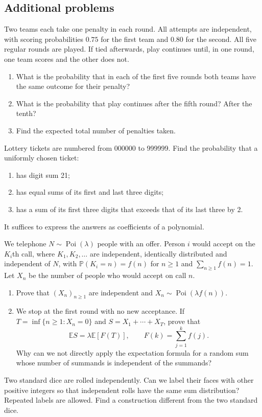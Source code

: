 \documentclass[11pt,a4paper]{article}
\newenvironment{enumeratea}{\begin{enumerate}[label=(\alph*),itemsep=0.28em,topsep=0.25em]}{\end{enumerate}}
\newcommand{\Pbb}{\mathbb P}
\newcommand{\Ebb}{\mathbb E}
\newcommand{\Poi}{\operatorname{Poi}}
\newcounter{problem}[section]
\begin{document}
\subsection*{Additional problems}
\begin{problempencil}
Two teams each take one penalty in each round. All attempts are independent,
with scoring probabilities $0.75$ for the first team and $0.80$ for the second.
All five regular rounds are played. If tied afterwards, play continues until,
in one round, one team scores and the other does not.
\begin{enumeratea}
  \item What is the probability that in each of the first five rounds both teams
  have the same outcome for their penalty?
  \item What is the probability that play continues after the fifth round? After the tenth?
  \item Find the expected total number of penalties taken.
\end{enumeratea}
\end{problempencil}
\begin{problem}
Lottery tickets are numbered from 000000 to 999999. Find the probability that a uniformly chosen ticket:
\begin{enumeratea}
  \item has digit sum 21;
  \item has equal sums of its first and last three digits;
  \item has a sum of its first three digits that exceeds that of its last three by 2.
\end{enumeratea}
It suffices to express the answers as coefficients of a polynomial.
\end{problem}
\begin{problempencil}
We telephone $N\sim\Poi(\lambda)$ people with an offer. Person $i$ would accept
on the $K_i$th call, where $K_1,K_2,\ldots$ are independent, identically distributed
and independent of $N$, with $\Pbb(K_i=n)=f(n)$ for $n\ge1$ and
$\sum_{n\ge1}f(n)=1$. Let $X_n$ be the number of people who would accept on call $n$.
\begin{enumeratea}
  \item Prove that $(X_n)_{n\ge1}$ are independent and $X_n\sim\Poi(\lambda f(n))$.
  \item We stop at the first round with no new acceptance. If
  $T=\inf\{n\ge1:X_n=0\}$ and $S=X_1+\cdots+X_T$, prove that
  \[ \Ebb S=\lambda\Ebb[F(T)],\qquad F(k)=\sum_{j=1}^k f(j). \]
  Why can we not directly apply the expectation formula for a random sum whose
  number of summands is independent of the summands?
\end{enumeratea}
\end{problempencil}
\begin{problempencil}
Two standard dice are rolled independently. Can we label their faces with other
positive integers so that independent rolls have the same sum distribution?
Repeated labels are allowed. Find a construction different from the two standard dice.
\end{problempencil}
\end{document}
